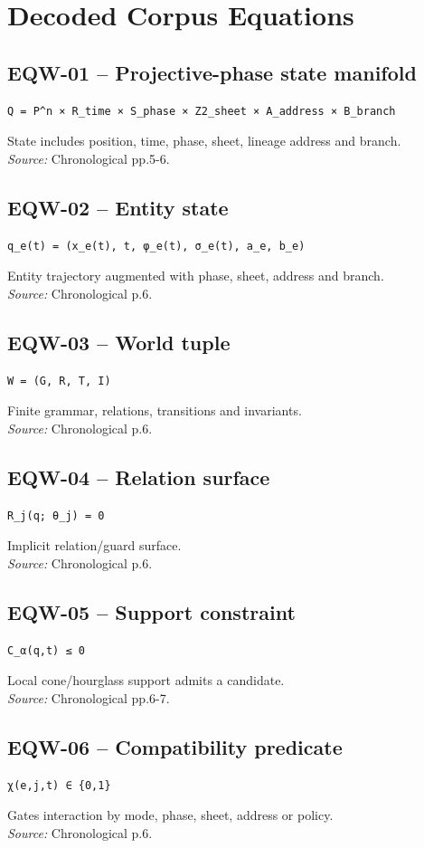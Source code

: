 \documentclass{article}
\begin{document}
\section*{Decoded Corpus Equations}
\subsection*{EQW-01 -- Projective-phase state manifold}
\begin{verbatim}
Q = P^n × R_time × S_phase × Z2_sheet × A_address × B_branch
\end{verbatim}
State includes position, time, phase, sheet, lineage address and branch.\\
\textit{Source:} Chronological pp.5-6.
\subsection*{EQW-02 -- Entity state}
\begin{verbatim}
q_e(t) = (x_e(t), t, φ_e(t), σ_e(t), a_e, b_e)
\end{verbatim}
Entity trajectory augmented with phase, sheet, address and branch.\\
\textit{Source:} Chronological p.6.
\subsection*{EQW-03 -- World tuple}
\begin{verbatim}
W = (G, R, T, I)
\end{verbatim}
Finite grammar, relations, transitions and invariants.\\
\textit{Source:} Chronological p.6.
\subsection*{EQW-04 -- Relation surface}
\begin{verbatim}
R_j(q; θ_j) = 0
\end{verbatim}
Implicit relation/guard surface.\\
\textit{Source:} Chronological p.6.
\subsection*{EQW-05 -- Support constraint}
\begin{verbatim}
C_α(q,t) ≤ 0
\end{verbatim}
Local cone/hourglass support admits a candidate.\\
\textit{Source:} Chronological pp.6-7.
\subsection*{EQW-06 -- Compatibility predicate}
\begin{verbatim}
χ(e,j,t) ∈ {0,1}
\end{verbatim}
Gates interaction by mode, phase, sheet, address or policy.\\
\textit{Source:} Chronological p.6.
\end{document}
